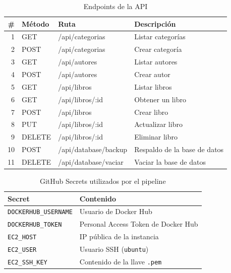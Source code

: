 \documentclass[12pt,letterpaper]{article}
\begin{document}
\begin{table}[H]
  \centering
  \caption{Endpoints de la API}
  \begin{tabular}{rlll}
    \toprule
    \# & Método & Ruta & Descripción \\
    \midrule
    1  & GET    & /api/categorias        & Listar categorías \\
    2  & POST   & /api/categorias        & Crear categoría \\
    3  & GET    & /api/autores           & Listar autores \\
    4  & POST   & /api/autores           & Crear autor \\
    5  & GET    & /api/libros            & Listar libros \\
    6  & GET    & /api/libros/:id        & Obtener un libro \\
    7  & POST   & /api/libros            & Crear libro \\
    8  & PUT    & /api/libros/:id        & Actualizar libro \\
    9  & DELETE & /api/libros/:id        & Eliminar libro \\
    10 & POST   & /api/database/backup   & Respaldo de la base de datos \\
    11 & DELETE & /api/database/vaciar   & Vaciar la base de datos \\
    \bottomrule
  \end{tabular}
\end{table}

\begin{table}[H]
  \centering
  \caption{GitHub Secrets utilizados por el pipeline}
  \begin{tabular}{ll}
    \toprule
    Secret & Contenido \\
    \midrule
    \texttt{DOCKERHUB\_USERNAME} & Usuario de Docker Hub \\
    \texttt{DOCKERHUB\_TOKEN}    & Personal Access Token de Docker Hub \\
    \texttt{EC2\_HOST}           & IP pública de la instancia \\
    \texttt{EC2\_USER}           & Usuario SSH (\texttt{ubuntu}) \\
    \texttt{EC2\_SSH\_KEY}       & Contenido de la llave \texttt{.pem} \\
    \bottomrule
  \end{tabular}
\end{table}

\end{document}
